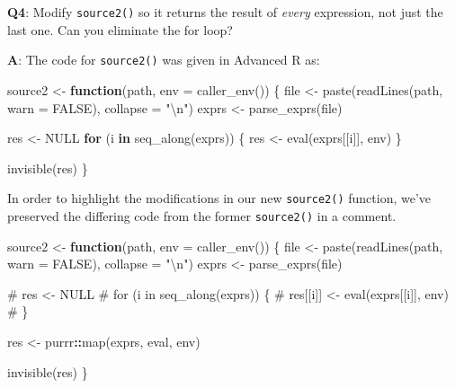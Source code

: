 \documentclass[
]{krantz}
\makeatletter
\newenvironment{Shaded}{\begin{snugshade}}{\end{snugshade}}
\newcommand{\CharTok}[1]{\textcolor[rgb]{0.31,0.60,0.02}{#1}}
\newcommand{\CommentTok}[1]{\textcolor[rgb]{0.56,0.35,0.01}{\textit{#1}}}
\newcommand{\ControlFlowTok}[1]{\textcolor[rgb]{0.13,0.29,0.53}{\textbf{#1}}}
\newcommand{\DataTypeTok}[1]{\textcolor[rgb]{0.13,0.29,0.53}{#1}}
\newcommand{\KeywordTok}[1]{\textcolor[rgb]{0.13,0.29,0.53}{\textbf{#1}}}
\newcommand{\NormalTok}[1]{#1}
\newcommand{\OperatorTok}[1]{\textcolor[rgb]{0.81,0.36,0.00}{\textbf{#1}}}
\newcommand{\OtherTok}[1]{\textcolor[rgb]{0.56,0.35,0.01}{#1}}
\newcommand{\StringTok}[1]{\textcolor[rgb]{0.31,0.60,0.02}{#1}}
\newenvironment{kframe}{%
\medskip{}
\setlength{\fboxsep}{.8em}
 \def\at@end@of@kframe{}%
 \ifinner\ifhmode%
  \def\at@end@of@kframe{\end{minipage}}%
  \begin{minipage}{\columnwidth}%
 \fi\fi%
 \def\FrameCommand##1{\hskip\@totalleftmargin \hskip-\fboxsep
 \colorbox{shadecolor}{##1}\hskip-\fboxsep
     \hskip-\linewidth \hskip-\@totalleftmargin \hskip\columnwidth}%
 \MakeFramed {\advance\hsize-\width
   \@totalleftmargin\z@ \linewidth\hsize
   \@setminipage}}%
 {\par\unskip\endMakeFramed%
 \at@end@of@kframe}
\renewenvironment{Shaded}{\begin{kframe}}{\end{kframe}}
\renewcommand{\KeywordTok} [1]{\textcolor[rgb]{0.00,0.44,0.13}{{#1}}}
\renewcommand{\DataTypeTok}[1]{\textcolor[rgb]{0.56,0.13,0.00}{{#1}}}
\renewcommand{\CharTok}    [1]{\textcolor[rgb]{0.25,0.44,0.63}{{#1}}}
\renewcommand{\StringTok}  [1]{\textcolor[rgb]{0.25,0.44,0.63}{{#1}}}
\renewcommand{\CommentTok} [1]{\textcolor[rgb]{0.38,0.63,0.69}{{#1}}}
\renewcommand{\OtherTok}   [1]{\textcolor[rgb]{0.00,0.44,0.13}{{#1}}}
\renewcommand{\NormalTok}  [1]{{#1}}
\makeatother
\begin{document}
\textbf{{Q4}}: Modify \texttt{source2()} so it returns the result of \emph{every} expression, not just the last one. Can you eliminate the for loop?

\textbf{{A}}: The code for \texttt{source2()} was given in Advanced R as:

\begin{Shaded}
\begin{Highlighting}[]
\NormalTok{source2 <-}\StringTok{ }\ControlFlowTok{function}\NormalTok{(path, }\DataTypeTok{env =} \KeywordTok{caller_env}\NormalTok{()) \{}
\NormalTok{  file <-}\StringTok{ }\KeywordTok{paste}\NormalTok{(}\KeywordTok{readLines}\NormalTok{(path, }\DataTypeTok{warn =} \OtherTok{FALSE}\NormalTok{), }\DataTypeTok{collapse =} \StringTok{"}\CharTok{\textbackslash{}n}\StringTok{"}\NormalTok{)}
\NormalTok{  exprs <-}\StringTok{ }\KeywordTok{parse_exprs}\NormalTok{(file)}

\NormalTok{  res <-}\StringTok{ }\OtherTok{NULL}
  \ControlFlowTok{for}\NormalTok{ (i }\ControlFlowTok{in} \KeywordTok{seq_along}\NormalTok{(exprs)) \{}
\NormalTok{    res <-}\StringTok{ }\KeywordTok{eval}\NormalTok{(exprs[[i]], env)}
\NormalTok{  \}}

  \KeywordTok{invisible}\NormalTok{(res)}
\NormalTok{\}}
\end{Highlighting}
\end{Shaded}

In order to highlight the modifications in our new \texttt{source2()} function, we've preserved the differing code from the former \texttt{source2()} in a comment.

\begin{Shaded}
\begin{Highlighting}[]
\NormalTok{source2 <-}\StringTok{ }\ControlFlowTok{function}\NormalTok{(path, }\DataTypeTok{env =} \KeywordTok{caller_env}\NormalTok{()) \{}
\NormalTok{  file <-}\StringTok{ }\KeywordTok{paste}\NormalTok{(}\KeywordTok{readLines}\NormalTok{(path, }\DataTypeTok{warn =} \OtherTok{FALSE}\NormalTok{), }\DataTypeTok{collapse =} \StringTok{"}\CharTok{\textbackslash{}n}\StringTok{"}\NormalTok{)}
\NormalTok{  exprs <-}\StringTok{ }\KeywordTok{parse_exprs}\NormalTok{(file)}
  
  \CommentTok{# res <- NULL}
  \CommentTok{# for (i in seq_along(exprs)) \{}
  \CommentTok{#   res[[i]] <- eval(exprs[[i]], env)}
  \CommentTok{# \}}
  
\NormalTok{  res <-}\StringTok{ }\NormalTok{purrr}\OperatorTok{::}\KeywordTok{map}\NormalTok{(exprs, eval, env)}
  
  \KeywordTok{invisible}\NormalTok{(res)}
\NormalTok{\}}
\end{Highlighting}
\end{Shaded}
\end{document}
